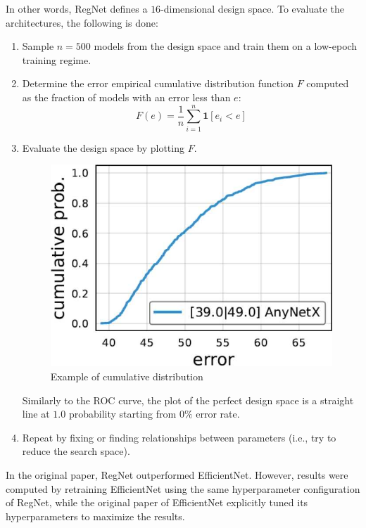 \begin{description}
        In other words, RegNet defines a $16$-dimensional design space. To evaluate the architectures, the following is done:
        \begin{enumerate}
            \item Sample $n=500$ models from the design space and train them on a low-epoch training regime.
            \item Determine the error empirical cumulative distribution function $F$ computed as the fraction of models with an error less than $e$:
            \[ F(e) = \frac{1}{n} \sum_{i=1}^{n} \mathbf{1}[e_i < e] \]
            \item Evaluate the design space by plotting $F$.
                \begin{figure}[H]
                    \centering
                    \includegraphics[width=0.25\linewidth]{./img/edf.jpg}
                    \caption{Example of cumulative distribution}
                \end{figure}

                \begin{remark}
                    Similarly to the ROC curve, the plot of the perfect design space is a straight line at $1.0$ probability starting from $0\%$ error rate.
                \end{remark}
            \item Repeat by fixing or finding relationships between parameters (i.e., try to reduce the search space).
        \end{enumerate}
\end{description}

\begin{remark}
    In the original paper, RegNet outperformed EfficientNet. However, results were computed by retraining EfficientNet using the same hyperparameter configuration of RegNet, while the original paper of EfficientNet explicitly tuned its hyperparameters to maximize the results.
\end{remark}